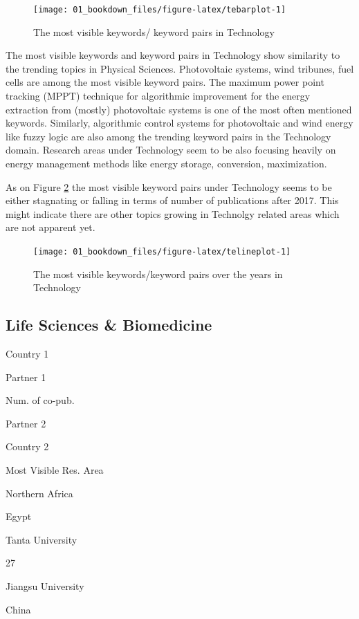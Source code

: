 \documentclass[
]{book}
\begin{document}
\begin{figure}
\texttt{[image: 01\_bookdown\_files/figure-latex/tebarplot-1]} \caption{The most visible keywords/ keyword pairs in Technology}\label{fig:tebarplot}
\end{figure}

The most visible keywords and keyword pairs in Technology show similarity to the trending topics in Physical Sciences. Photovoltaic systems, wind tribunes, fuel cells are among the most visible keyword pairs. The maximum power point tracking (MPPT) technique for algorithmic improvement for the energy extraction from (mostly) photovoltaic systems is one of the most often mentioned keywords. Similarly, algorithmic control systems for photovoltaic and wind energy like fuzzy logic are also among the trending keyword pairs in the Technology domain. Research areas under Technology seem to be also focusing heavily on energy management methods like energy storage, conversion, maximization.

As on Figure \ref{fig:telineplot} the most visible keyword pairs under Technology seems to be either stagnating or falling in terms of number of publications after 2017. This might indicate there are other topics growing in Technolgy related areas which are not apparent yet.

\begin{figure}
\texttt{[image: 01\_bookdown\_files/figure-latex/telineplot-1]} \caption{The most visible keywords/keyword pairs over the years in Technology}\label{fig:telineplot}
\end{figure}

\hypertarget{life-sciences-biomedicine}{%
\subsection{Life Sciences \& Biomedicine}\label{life-sciences-biomedicine}}

Country 1

Partner 1

Num. of co-pub.

Partner 2

Country 2

Most Visible Res. Area

Northern Africa

{Egypt }

{Tanta University }

{27}

{Jiangsu University }

{China }
\end{document}
